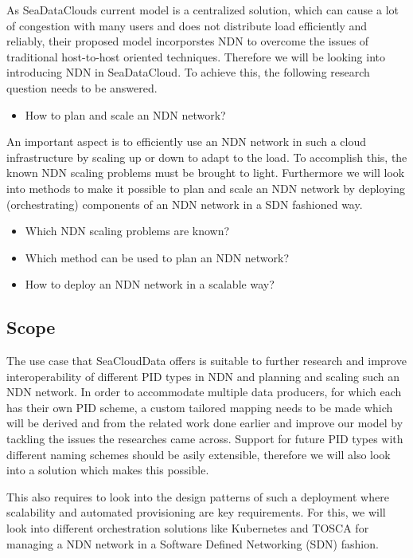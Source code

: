 As SeaDataClouds current model is a centralized solution, which can cause a lot of congestion with many users and does not distribute load efficiently and reliably, their proposed model incorporstes NDN to overcome the issues of traditional host-to-host oriented techniques. Therefore we will be looking into introducing NDN in SeaDataCloud. To achieve this, the following research question needs to be answered.   
\begin{itemize}
    \item How to plan and scale an NDN network?
\end{itemize}

An important aspect is to efficiently use an NDN network in such a cloud infrastructure by scaling up or down to adapt to the load. To accomplish this, 
the known NDN scaling problems must be brought to light. Furthermore we will look into methods to make it possible to plan and scale an NDN network by deploying (orchestrating) components of an NDN network in a SDN fashioned way.
\begin{itemize}
    \begin{itemize}
	    \item Which NDN scaling problems are known?
	    \item Which method can be used to plan an NDN network?
	    \item How to deploy an NDN network in a scalable way?
	\end{itemize}
\end{itemize}


\subsection{Scope}
The use case that SeaCloudData offers is suitable to further research and improve interoperability of different PID types in NDN and planning and scaling such an NDN network. In order to accommodate multiple data producers, for which each has their own PID scheme, a custom tailored mapping needs to be made which will be derived and from the related work done earlier and improve our model by tackling the issues the researches came across. Support for future PID types with different naming schemes should be asily extensible, therefore we will also look into a solution which makes this possible. 

This also requires to look into the design patterns of such a deployment where scalability and automated provisioning are key requirements. For this, we will look into different orchestration solutions like Kubernetes and TOSCA for managing a NDN network in a Software Defined Networking (SDN) fashion.

